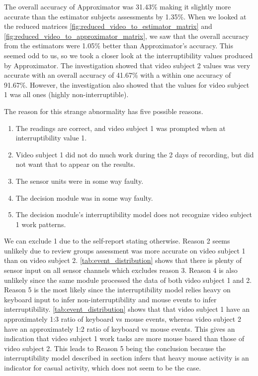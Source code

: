 \documentclass{sigchi}
\begin{document}
The overall accuracy of Approximator was 31.43\% making it slightly more accurate than the estimator subjects assessments by 1.35\%.
When we looked at the reduced matrices \autoref{fig:reduced_video_to_estimator_matrix} and \autoref{fig:reduced_video_to_approximator_matrix}, we saw that the overall accuracy from the estimators were 1.05\% better than Approximator's accuracy.
This seemed odd to us, so we took a closer look at the interruptibility values produced by Approximator.
The investigation showed that video subject 2 values was very accurate with an overall accuracy of 41.67\% with a within one accuracy of 91.67\%.
However, the investigation also showed that the values for video subject 1 was all ones (highly non-interruptible).

The reason for this strange abnormality has five possible reasons.
\begin{enumerate}%
  \item The readings are correct, and video subject 1 was prompted when at interruptibility value 1.
  \item Video subject 1 did not do much work during the 2 days of recording, but did not want that to appear on the results.
  \item The sensor units were in some way faulty.
  \item The decision module was in some way faulty.
  \item The decision module's interruptibility model does not recognize video subject 1 work patterns.
\end{enumerate}

We can exclude 1 due to the self-report stating otherwise.
Reason 2 seems unlikely due to review groups assessment was more accurate on video subject 1 than on video subject 2.
\autoref{tab:event_distribution} shows that there is plenty of sensor input on all sensor channels which excludes reason 3.
Reason 4 is also unlikely since the same module processed the data of both video subject 1 and 2.
Reason 5 is the most likely since the interruptibility model relies heavy on keyboard input to infer non-interruptibility and mouse events to infer interruptibility.
\autoref{tab:event_distribution} shows that that video subject 1 have an approximately 1:3 ratio of keyboard vs mouse events, whereas video subject 2 have an approximately 1:2 ratio of keyboard vs mouse events.
This gives an indication that video subject 1 work tasks are more mouse based than those of video subject 2.
This leads to Reason 5 being the conclusion because the interruptibility model described in section  infers that heavy mouse activity is an indicator for casual activity, which does not seem to be the case.
\end{document}
